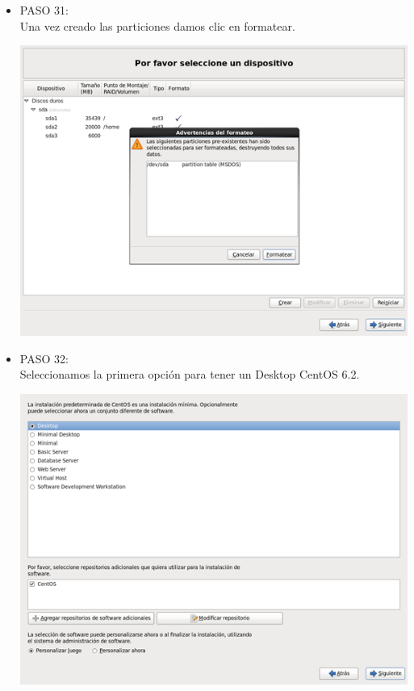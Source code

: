 \begin{itemize}
\item PASO 31:
\\Una vez creado las particiones damos clic en formatear.
		\begin{center}
		\includegraphics[width=13cm]{./Imagenes/31}
		\end{center}
	
	\end{itemize} 

\begin{itemize}
\item PASO 32:
\\Seleccionamos  la primera opción para  tener un Desktop CentOS 6.2.
		\begin{center}
		\includegraphics[width=13cm]{./Imagenes/32}
		\end{center}
	\\\
	\end{itemize} 

